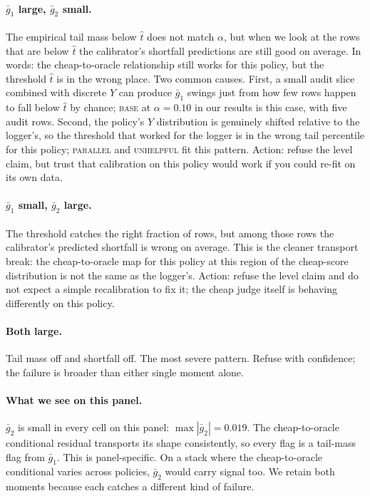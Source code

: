 \documentclass[11pt]{article}
\newcommand{\that}{\widehat{t}}
\begin{document}
\paragraph{$\bar g_1$ large, $\bar g_2$ small.}
The empirical tail mass below $\that$ does not match $\alpha$, but
when we look at the rows that are below $\that$ the calibrator's
shortfall predictions are still good on average. In words: the
cheap-to-oracle relationship still works for this policy, but the
threshold $\that$ is in the wrong place. Two common causes. First, a
small audit slice combined with discrete $Y$ can produce $\bar g_1$
swings just from how few rows happen to fall below $\that$ by chance;
\textsc{base} at $\alpha = 0.10$ in our results is this case, with
five audit rows. Second, the policy's $Y$ distribution is genuinely
shifted relative to the logger's, so the threshold that worked for
the logger is in the wrong tail percentile for this policy;
\textsc{parallel} and \textsc{unhelpful} fit this pattern. Action:
refuse the level claim, but trust that calibration on this policy
would work if you could re-fit on its own data.

\paragraph{$\bar g_1$ small, $\bar g_2$ large.}
The threshold catches the right fraction of rows, but among those
rows the calibrator's predicted shortfall is wrong on average. This
is the cleaner transport break: the cheap-to-oracle map for this
policy at this region of the cheap-score distribution is not the
same as the logger's. Action: refuse the level claim and do not
expect a simple recalibration to fix it; the cheap judge itself is
behaving differently on this policy.

\paragraph{Both large.}
Tail mass off and shortfall off. The most severe pattern. Refuse with
confidence; the failure is broader than either single moment alone.

\paragraph{What we see on this panel.}
$\bar g_2$ is small in every cell on this panel: $\max |\bar g_2| =
0.019$. The cheap-to-oracle conditional residual transports its shape
consistently, so every flag is a tail-mass flag from $\bar g_1$. This
is panel-specific. On a stack where the cheap-to-oracle conditional
varies across policies, $\bar g_2$ would carry signal too. We retain
both moments because each catches a different kind of failure.
\end{document}

